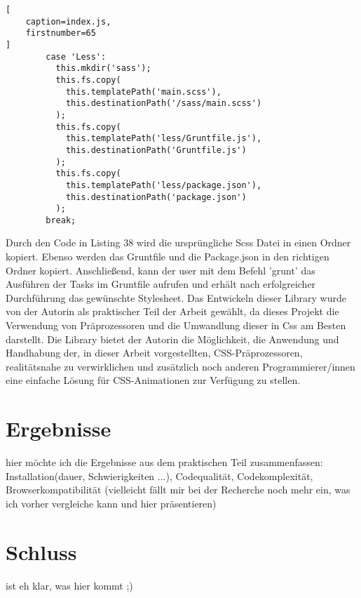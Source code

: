 \begin{lstlisting}[
	caption=index.js,
	firstnumber=65
]
        case 'Less':
          this.mkdir('sass');
          this.fs.copy(
            this.templatePath('main.scss'),
            this.destinationPath('/sass/main.scss')
          );
          this.fs.copy(
            this.templatePath('less/Gruntfile.js'),
            this.destinationPath('Gruntfile.js')
          );
          this.fs.copy(
            this.templatePath('less/package.json'),
            this.destinationPath('package.json')
          );
        break;
\end{lstlisting}
Durch den Code in Listing 38 wird die ursprüngliche Scss Datei in einen Ordner kopiert. Ebenso werden das Gruntfile und die Package.json in den richtigen Ordner kopiert. \newline
Anschließend, kann der user mit dem Befehl 'grunt' das Ausführen der Tasks im Gruntfile aufrufen und erhält nach erfolgreicher Durchführung das gewünschte Stylesheet.
\newline\newline
Das Entwickeln dieser Library wurde von der Autorin als praktischer Teil der Arbeit gewählt, da dieses Projekt die Verwendung von Präprozessoren und die Umwandlung dieser in Css am Besten darstellt. \newline
Die Library bietet der Autorin die Möglichkeit, die Anwendung und Handhabung der, in dieser Arbeit vorgestellten, CSS-Präprozessoren, realitätsnahe zu verwirklichen und zusätzlich noch anderen Programmierer/innen eine einfache Lösung für CSS-Animationen zur Verfügung zu stellen.\newline
\newpage
\section{Ergebnisse}
hier möchte ich die Ergebnisse aus dem praktischen Teil zusammenfassen: Installation(dauer, Schwierigkeiten ...), Codequalität, Codekomplexität, Browserkompatibilität (vielleicht fällt mir bei der Recherche noch mehr ein, was ich vorher vergleiche kann und hier präsentieren)

\section{Schluss}
ist eh klar, was hier kommt ;)




